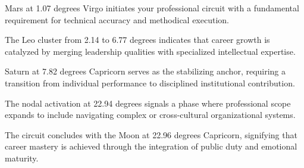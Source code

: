 \begin{diamondlist}
  \item {\fontsize{8.5}{12}\selectfont Mars at 1.07 degrees Virgo initiates your professional circuit with a fundamental requirement for technical accuracy and methodical execution.}
  \item {\fontsize{8.5}{12}\selectfont The Leo cluster from 2.14 to 6.77 degrees indicates that career growth is catalyzed by merging leadership qualities with specialized intellectual expertise.}
  \item {\fontsize{8.5}{12}\selectfont Saturn at 7.82 degrees Capricorn serves as the stabilizing anchor, requiring a transition from individual performance to disciplined institutional contribution.}
  \item {\fontsize{8.5}{12}\selectfont The nodal activation at 22.94 degrees signals a phase where professional scope expands to include navigating complex or cross-cultural organizational systems.}
  \item {\fontsize{8.5}{12}\selectfont The circuit concludes with the Moon at 22.96 degrees Capricorn, signifying that career mastery is achieved through the integration of public duty and emotional maturity.}
\end{diamondlist}


